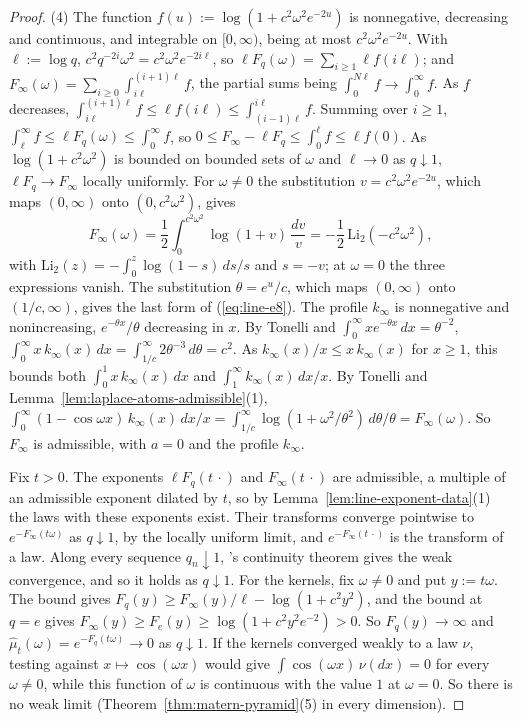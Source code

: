 \begin{proof}
(4) The function $f(u) := \log(1 + c^2\omega^2e^{-2u})$ is nonnegative, decreasing and continuous,
and integrable on $[0,\infty)$, being at most $c^2\omega^2e^{-2u}$. With $\ell := \log q$,
$c^2q^{-2i}\omega^2 = c^2\omega^2e^{-2i\ell}$, so $\ell F_q(\omega) = \sum_{i \ge 1}\ell f(i\ell)$;
and $F_\infty(\omega) = \sum_{i \ge 0}\int_{i\ell}^{(i+1)\ell}f$, the partial sums being
$\int_0^{N\ell}f \to \int_0^\infty f$. As $f$ decreases,
$\int_{i\ell}^{(i+1)\ell}f \le \ell f(i\ell) \le \int_{(i-1)\ell}^{i\ell}f$. Summing over $i \ge 1$,
$\int_\ell^\infty f \le \ell F_q(\omega) \le \int_0^\infty f$, so
$0 \le F_\infty - \ell F_q \le \int_0^\ell f \le \ell f(0)$. As $\log(1 + c^2\omega^2)$ is bounded
on bounded sets of $\omega$ and $\ell \to 0$ as $q \downarrow 1$, $\ell F_q \to F_\infty$ locally
uniformly. For $\omega \ne 0$ the substitution $v = c^2\omega^2e^{-2u}$, which maps $(0,\infty)$
onto $(0, c^2\omega^2)$, gives
\[
  F_\infty(\omega) = \frac12\int_0^{c^2\omega^2}\log(1 + v)\,\frac{dv}{v}
  = -\frac12\,\mathrm{Li}_2(-c^2\omega^2),
\]
with $\mathrm{Li}_2(z) = -\int_0^z\log(1 - s)\,ds/s$ and $s = -v$; at $\omega = 0$ the three
expressions vanish. The substitution $\theta = e^u/c$, which maps $(0,\infty)$ onto
$(1/c,\infty)$, gives the last form of (\ref{eq:line-e8}). The profile $k_\infty$ is nonnegative and
nonincreasing, $e^{-\theta x}/\theta$ decreasing in $x$. By Tonelli and
$\int_0^\infty xe^{-\theta x}\,dx = \theta^{-2}$,
$\int_0^\infty x\,k_\infty(x)\,dx = \int_{1/c}^\infty2\theta^{-3}\,d\theta = c^2$. As
$k_\infty(x)/x \le x\,k_\infty(x)$ for $x \ge 1$, this bounds both $\int_0^1x\,k_\infty(x)\,dx$
and $\int_1^\infty k_\infty(x)\,dx/x$. By Tonelli and Lemma~\ref{lem:laplace-atoms-admissible}(1),
$\int_0^\infty(1 - \cos\omega x)\,k_\infty(x)\,dx/x
= \int_{1/c}^\infty\log(1 + \omega^2/\theta^2)\,d\theta/\theta = F_\infty(\omega)$. So $F_\infty$ is
admissible, with $a = 0$ and the profile $k_\infty$.

Fix $t > 0$. The exponents $\ell F_q(t\,\cdot)$ and $F_\infty(t\,\cdot)$ are admissible, a multiple
of an admissible exponent dilated by $t$, so by Lemma~\ref{lem:line-exponent-data}(1) the laws with
these exponents exist. Their transforms converge pointwise to $e^{-F_\infty(t\omega)}$ as
$q \downarrow 1$, by the locally uniform limit, and $e^{-F_\infty(t\,\cdot)}$ is the transform of
a law. Along every sequence $q_n \downarrow 1$, \Levy's continuity theorem gives the weak
convergence, and so it holds as $q \downarrow 1$. For the kernels, fix $\omega \ne 0$ and put
$y := t\omega$. The bound gives $F_q(y) \ge F_\infty(y)/\ell - \log(1 + c^2y^2)$, and the bound at
$q = e$ gives $F_\infty(y) \ge F_e(y) \ge \log(1 + c^2y^2e^{-2}) > 0$. So $F_q(y) \to \infty$ and
$\widehat\mu_t(\omega) = e^{-F_q(t\omega)} \to 0$ as $q \downarrow 1$. If the kernels converged
weakly to a law $\nu$, testing against $x \mapsto \cos(\omega x)$ would give
$\int\cos(\omega x)\,\nu(dx) = 0$ for every $\omega \ne 0$, while this function of $\omega$ is
continuous with the value $1$ at $\omega = 0$. So there is no weak limit
(Theorem~\ref{thm:matern-pyramid}(5) in every dimension).
\end{proof}

